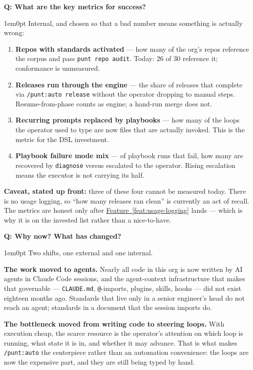 \documentclass[11pt,letterpaper]{article}
\newcounter{faqnum}
\newenvironment{faqpair}[1]{%
  \needspace{4\baselineskip}%
  \vspace{0.5em}%
  \refstepcounter{faqnum}%
  \noindent\textbf{\color{SectionBlue}Q\thefaqnum: #1}\par\nopagebreak[4]%
  \vspace{0.2em}%
  \begin{adjustwidth}{1em}{0pt}%
  \setlength{\parindent}{0pt}%
}{%
  \end{adjustwidth}%
  \vspace{0.5em}%
}
\newcommand{\featureref}[1]{\hyperref[#1]{Feature~\ref*{#1}}}
\begin{document}
\begin{faqpair}{What are the key metrics for success?}\label{faq:metrics}
  Internal, and chosen so that a bad number means something is actually wrong:
  \begin{enumerate}[nosep]
    \item \textbf{Repos with standards activated} --- how many of the org's
      repos reference the corpus and pass \texttt{punt repo audit}. Today: 26 of 30
      reference it; conformance is unmeasured.
    \item \textbf{Releases run through the engine} --- the share of releases
      that complete via \texttt{/punt:auto release} without the operator
      dropping to manual steps. Resume-from-phase counts as engine; a hand-run
      merge does not.
    \item \textbf{Recurring prompts replaced by playbooks} --- how many of the
      loops the operator used to type are now files that are actually invoked.
      This is the metric for the DSL investment.
    \item \textbf{Playbook failure mode mix} --- of playbook runs that fail,
      how many are recovered by \texttt{diagnose} versus escalated to the
      operator. Rising escalation means the executor is not carrying its half.
  \end{enumerate}
  \textbf{Caveat, stated up front:} three of these four cannot be measured
  today. There is no usage logging, so ``how many releases ran clean'' is
  currently an act of recall. The metrics are honest only after
  \featureref{feat:usage-logging} lands --- which is why it is on the invested
  list rather than a nice-to-have.
\end{faqpair}

\begin{faqpair}{Why now? What has changed?}\label{faq:why-now}
  Two shifts, one external and one internal.

  \textbf{The work moved to agents.} Nearly all code in this org is now written
  by AI agents in Claude Code sessions, and the agent-context infrastructure
  that makes that governable --- \texttt{CLAUDE.md}, \texttt{@}-imports,
  plugins, skills, hooks --- did not exist eighteen months ago. Standards that
  live only in a senior engineer's head do not reach an agent; standards in a
  document that the session imports do.

  \textbf{The bottleneck moved from writing code to steering loops.} With
  execution cheap, the scarce resource is the operator's attention on which
  loop is running, what state it is in, and whether it may advance. That is
  what makes \texttt{/punt:auto} the centerpiece rather than an automation
  convenience: the loops are now the expensive part, and they are still being
  typed by hand.
\end{faqpair}
\end{document}
